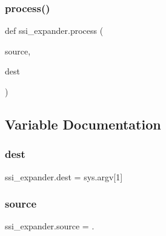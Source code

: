 \subsubsection{\texorpdfstring{process()}{process()}}
{\footnotesize\ttfamily def ssi\+\_\+expander.\+process (\begin{DoxyParamCaption}\item[{}]{source,  }\item[{}]{dest }\end{DoxyParamCaption})}



\subsection{Variable Documentation}
\mbox{\label{namespacessi__expander_ac2e87b5a0738e3d26bda34f001011cc4}} 
\subsubsection{\texorpdfstring{dest}{dest}}
{\footnotesize\ttfamily ssi\+\_\+expander.\+dest = sys.\+argv\mbox{[}1\mbox{]}}

\mbox{\label{namespacessi__expander_ae8fa20efba305e039de78680ea6b3fdb}} 
\subsubsection{\texorpdfstring{source}{source}}
{\footnotesize\ttfamily ssi\+\_\+expander.\+source = \textquotesingle{}.\textquotesingle{}}

